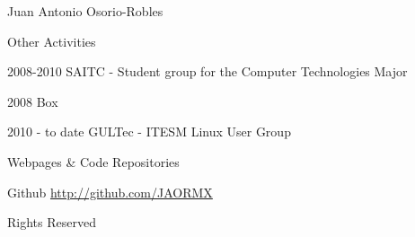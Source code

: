 \documentclass[spanish,10pt,letterpaper]{article}
\begin{document}
\begin{cv}{Juan Antonio Osorio-Robles}
	\begin{cvlist}{Other Activities}
		\item [2008-2010] SAITC - Student group for the Computer Technologies Major
		\item [2008] Box
		\item [2010 - to date] GULTec - ITESM Linux User Group
	\end{cvlist}

	\begin{cvlist}{Webpages \& Code Repositories}
		\item [Github] \href{http://github.com/JAORMX}{http://github.com/JAORMX}
	\end{cvlist}
	
	
		\date{{\footnotesize \today}}
	
\end{cv}

\begin{center}
	{\footnotesize Rights Reserved}
\end{center}

\end{document}
